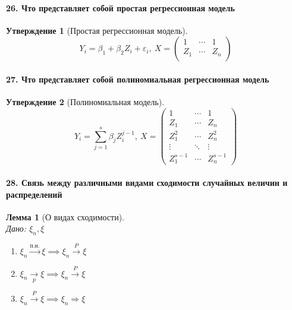 \documentclass[titlepage]{article}
\newtheorem{lemma}{Лемма}
\newtheorem*{statement}{Утверждение}
\begin{document}
\paragraph{26. Что представляет собой простая регрессионная модель}
\begin{statement}[Простая регрессионная модель]
	\[Y_i = \beta_1 + \beta_2 Z_i + \varepsilon_i,\ X = \begin{pmatrix}
		1   & \cdots & 1\\
		Z_1 & \cdots & Z_n\\
	\end{pmatrix}\]
\end{statement}

\paragraph{27. Что представляет собой полиномиальная регрессионная модель}
\begin{statement}[Полиномиальная модель]
	\[Y_i = \sum_{j=1}^s \beta_jZ_i^{j-1},\ X = \begin{pmatrix}
		1 & \cdots & 1\\
		Z_1 & \cdots & Z_n\\
		Z_1^2 & \cdots & Z_n^2\\
		\vdots & \ddots & \vdots\\
		Z_1^{s-1} & \cdots & Z_n^{s-1}
	\end{pmatrix}\]
\end{statement}

\paragraph{28. Связь между различными видами сходимости случайных величин и распределений}
\begin{lemma}[О видах сходимости] ~\\
	Дано: $\xi_n,\xi$
	\begin{enumerate}
		\item $\xi_n\xrightarrow{\text{п.н.}}\xi \implies \xi_n \overset{P}{\rightarrow}\xi$
		\item $\xi_n\underset{p}{\rightarrow}\xi \implies \xi_n \overset{P}{\rightarrow}\xi$
		\item $\xi_n \overset{P}{\rightarrow}\xi \implies \xi_n \Rightarrow \xi$
	\end{enumerate}
\end{lemma}
\end{document}
